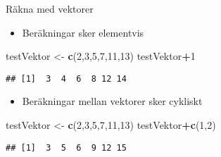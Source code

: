 \documentclass[
  10pt,
  ignorenonframetext,
]{beamer}
\newenvironment{Shaded}{\begin{snugshade}}{\end{snugshade}}
\newcommand{\DecValTok}[1]{\textcolor[rgb]{0.00,0.00,0.81}{#1}}
\newcommand{\FunctionTok}[1]{\textcolor[rgb]{0.13,0.29,0.53}{\textbf{#1}}}
\newcommand{\NormalTok}[1]{#1}
\newcommand{\OtherTok}[1]{\textcolor[rgb]{0.56,0.35,0.01}{#1}}
\newcommand{\SpecialCharTok}[1]{\textcolor[rgb]{0.81,0.36,0.00}{\textbf{#1}}}
\providecommand{\tightlist}{%
  \setlength{\itemsep}{0pt}\setlength{\parskip}{0pt}}
\begin{document}
\begin{frame}[fragile]{Räkna med vektorer}
\protect\hypertarget{ruxe4kna-med-vektorer}{}
\begin{itemize}
\tightlist
\item
  Beräkningar sker elementvis
\end{itemize}

\begin{Shaded}
\begin{Highlighting}[]
\NormalTok{testVektor }\OtherTok{\textless{}{-}} \FunctionTok{c}\NormalTok{(}\DecValTok{2}\NormalTok{,}\DecValTok{3}\NormalTok{,}\DecValTok{5}\NormalTok{,}\DecValTok{7}\NormalTok{,}\DecValTok{11}\NormalTok{,}\DecValTok{13}\NormalTok{)}
\NormalTok{testVektor}\SpecialCharTok{+}\DecValTok{1}
\end{Highlighting}
\end{Shaded}

\begin{verbatim}
## [1]  3  4  6  8 12 14
\end{verbatim}

\begin{itemize}
\tightlist
\item
  Beräkningar mellan vektorer sker cykliskt
\end{itemize}

\begin{Shaded}
\begin{Highlighting}[]
\NormalTok{testVektor }\OtherTok{\textless{}{-}} \FunctionTok{c}\NormalTok{(}\DecValTok{2}\NormalTok{,}\DecValTok{3}\NormalTok{,}\DecValTok{5}\NormalTok{,}\DecValTok{7}\NormalTok{,}\DecValTok{11}\NormalTok{,}\DecValTok{13}\NormalTok{)}
\NormalTok{testVektor}\SpecialCharTok{+}\FunctionTok{c}\NormalTok{(}\DecValTok{1}\NormalTok{,}\DecValTok{2}\NormalTok{)}
\end{Highlighting}
\end{Shaded}

\begin{verbatim}
## [1]  3  5  6  9 12 15
\end{verbatim}
\end{frame}
\end{document}
